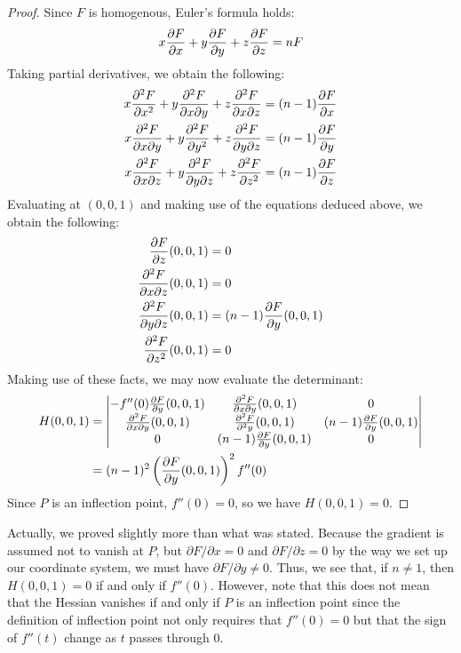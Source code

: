 \documentclass[12pt]{article}
\begin{document}
\begin{proof}
Since $F$ is homogenous, Euler's formula holds:
\[
 x {\partial F \over \partial x} +
 y {\partial F \over \partial y} +
 z {\partial F \over \partial z} = n F
\]
Taking partial derivatives, we obtain the following:
\begin{align*}
 x {\partial^2 F \over \partial x^2} +
 y {\partial^2 F \over \partial x \partial y} +
 z {\partial^2 F \over \partial x \partial z} = 
 (n - 1) {\partial F \over \partial x} \\
 x {\partial^2 F \over \partial x \partial y} +
 y {\partial^2 F \over \partial y^2} +
 z {\partial^2 F \over \partial y \partial z} = 
 (n - 1) {\partial F \over \partial y} \\
 x {\partial^2 F \over \partial x \partial z} +
 y {\partial^2 F \over \partial y \partial z} +
 z {\partial^2 F \over \partial z^2} = 
 (n - 1) {\partial F \over \partial z}
\end{align*}
Evaluating at $(0,0,1)$ and making use of the
equations deduced above, we obtain the following:
\begin{align*}
 {\partial F \over \partial z} (0,0,1) &= 0 \\
 {\partial^2 F \over \partial x \partial z} (0,0,1) &= 0 \\
 {\partial^2 F \over \partial y \partial z} (0,0,1) &= 
    (n - 1) {\partial F \over \partial y} (0,0,1) \\
 {\partial^2 F \over \partial z^2} (0,0,1) &= 0
\end{align*} 
Making use of these facts, we may now evaluate the determinant:
\begin{align*}
 H (0,0,1) &= \left| \begin{matrix}
   - f''(0) {\partial F \over \partial y} (0,0,1) &
   {\partial^2 F \over \partial x \partial y} (0,0,1) &
   0 \\
   {\partial^2 F \over \partial x \partial y} (0,0,1) &
   {\partial^2 F \over \partial^2 y} (0,0,1) & 
   (n - 1) {\partial F \over \partial y} (0,0,1) \\
   0 &
   (n - 1) {\partial F \over \partial y} (0,0,1) &
   0
  \end{matrix} \right| \\ &=
 (n - 1)^2 
 \left( {\partial F \over \partial y} (0,0,1) \right)^2
 f'' (0)
\end{align*}
Since $P$ is an inflection point, $f''(0) = 0$, so we
have $H(0,0,1) = 0$.
\end{proof}

Actually, we proved slightly more than what was stated.
Because the gradient is assumed not to vanish at $P$,
but $\partial F / \partial x = 0$ and $\partial F
/ \partial z = 0$ by the way we set up our coordinate
system, we must have $\partial F / \partial y \neq 0$.
Thus, we see that, if $n \neq 1$, then $H(0,0,1) = 0$ 
if and only if $f''(0)$.  However, note that this does
not mean that the Hessian vanishes if and only if $P$ is
an inflection point since the definition of inflection
point not only requires that $f''(0) = 0$ but that the
sign of $f''(t)$ change as $t$ passes through $0$.
\end{document}
